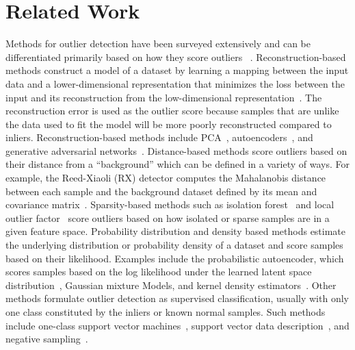 \documentclass[letterpaper]{article} %
\begin{document}
\section{Related Work}
Methods for outlier detection have been 
surveyed extensively and can be differentiated primarily based on how they 
score outliers
~\cite{pimentel2014review,chandola2009anomaly,markou2003novelty,
markou2003novelty2}.
%
Reconstruction-based methods construct a model of a dataset by learning 
a mapping between the input data and a lower-dimensional representation that
 minimizes the loss between the input and its reconstruction from the 
 low-dimensional representation~\citep{kerner2020comparison}. The 
 reconstruction error is used as the outlier score because samples
  that are unlike the data used to fit the model will be more poorly 
  reconstructed compared to inliers. Reconstruction-based methods
  include PCA~\cite{jablonski2015principal}, 
  autoencoders~\cite{richter2017safe,park2018multimodal}, and
  generative adversarial networks~\cite{akcay2018ganomaly}.
%
 Distance-based methods score outliers based on their distance from a
``background'' which can be defined in a variety of ways. For example,
the Reed-Xiaoli (RX) detector computes the 
Mahalanobis distance between each sample and the background dataset
defined by its mean and covariance matrix~\cite{reed1990adaptive}.
%
Sparsity-based methods such as isolation forest~\cite{liu2008isolation}
and local outlier factor~\cite{breunig2000lof}
 score outliers based on how isolated or sparse samples 
are in a given feature space. 
%
Probability distribution and density based methods estimate the underlying 
distribution or probability density of a dataset and score samples based on
their likelihood. Examples include the probabilistic
autoencoder, which scores samples based on the log likelihood under the learned
latent space distribution~\cite{bohm2020probabilistic}, Gaussian mixture 
Models, and kernel density estimators~\cite{chandola2009anomaly}. 
%
Other methods formulate outlier detection as supervised classification, 
usually with only one class constituted by the inliers or 
known normal samples.
Such methods include one-class support vector 
machines~\cite{scholkopf1999support},
support vector data description~\cite{pimentel2014review},
and negative sampling~\cite{sipple:neg-sampling20}.
\end{document}
